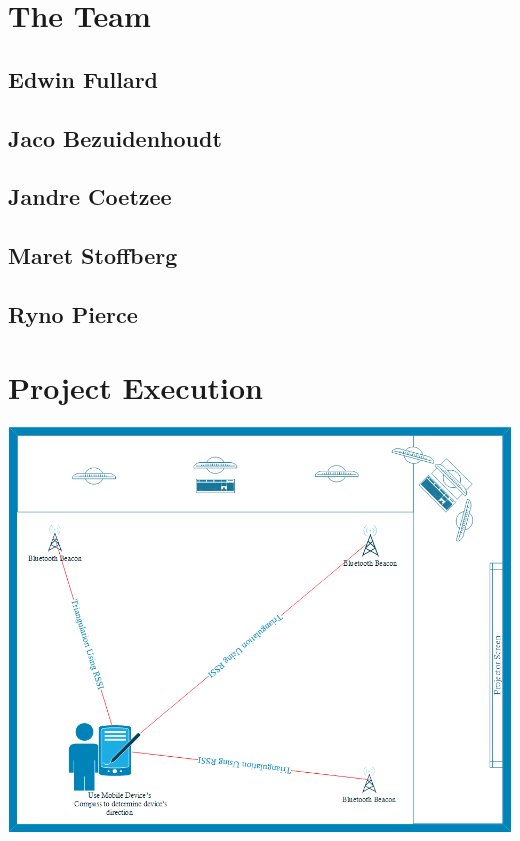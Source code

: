 \documentclass[a4paper,12pt,titlepage]{article}
\begin{document}
	
	
	\newpage
	\tableofcontents
	\newpage
	
	\section{The Team}
	
		\subsection{Edwin Fullard}
		
		\newpage
		
		\subsection{Jaco Bezuidenhoudt}
		
		\newpage
		
		\subsection{Jandre Coetzee}
		
		\newpage
		
		\subsection{Maret Stoffberg}
		
		\newpage
		
		\subsection{Ryno Pierce}
		
		\newpage
		
	\section{Project Execution}
		\includegraphics[scale=0.5]{./Images/Concept.png}
	
\end{document}
